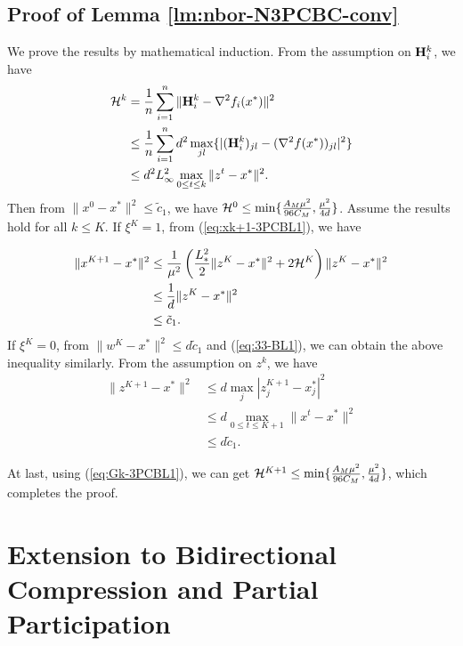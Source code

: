 \documentclass[11pt]{article}
\begin{document}
	
	
	\subsection{Proof of Lemma \ref{lm:nbor-N3PCBC-conv}}
	
	We prove the results by mathematical induction. From the assumption on $\mathbf{H}_i^k$, we have 
	\begin{align}
		{\cal H}^k & = \frac{1}{n} \sum_{i=1}^n \|\mathbf{H}_i^k - \nabla^2 f_i(x^*)\|^2 \nonumber \\ 
		& \leq \frac{1}{n} \sum_{i=1}^n d^2 \max_{jl} \{  | (\mathbf{H}_i^k)_{jl} - (\nabla^2 f(x^*))_{jl} |^2  \} \nonumber \\ 
		& \leq d^2 L_{\infty}^2 \max_{0\leq t \leq k} \|z^t-x^*\|^2. \label{eq:Gk-3PCBL1}
	\end{align}
	Then from $\|x^0-x^*\|^2 \leq {\tilde c}_1$, we have ${\cal H}^0 \leq \min \{  \frac{A_M\mu^2}{96C_M}, \frac{\mu^2}{4d}  \}$. Assume the results hold for all $k\leq K$. If $\xi^K=1$, from (\ref{eq:xk+1-3PCBL1}), we have 
	
	\begin{align*}
		\|x^{K+1} - x^*\|^2 & \leq \frac{1}{\mu^2} \left(  \frac{L_{*}^2}{2} \|z^K-x^*\|^2 + 2{\cal H}^K  \right) \|z^K-x^*\|^2 \\ 
		& \leq \frac{1}{d}\|z^K-x^*\|^2 \\ 
		& \leq {\tilde c}_1. 
	\end{align*}
	If $\xi^K=0$, from $\|w^K-x^*\|^2 \leq d {\tilde c}_1$ and (\ref{eq:33-BL1}), we can obtain the above inequality similarly. From the assumption on $z^k$, we have 
	\begin{align*}
		\|z^{K+1} - x^*\|^2 & \leq d \max_{j} | z_j^{K+1} -x_j^* |^2 \\ 
		& \leq d \max_{0\leq t\leq K+1} \|x^t-x^*\|^2 \\ 
		& \leq d {\tilde c}_1. 
	\end{align*}
	
	At last, using (\ref{eq:Gk-3PCBL1}), we can get ${\cal H}^{K+1} \leq \min \{  \frac{A_M\mu^2}{96C_M}, \frac{\mu^2}{4d}  \}$, which completes the proof. 
	
	
	
	
	\section{Extension to Bidirectional Compression and Partial Participation}
	
\end{document}
